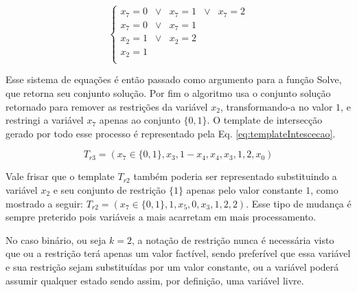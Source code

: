 \begin{equation}
\left\{\begin{matrix}
x_7	  = 0 	& \vee &	x_7	=	1 & \vee &	x_7	= 2	\\ 
x_7   = 0 	& \vee &	x_7	=	1					\\ 
x_2   = 1 	& \vee &	x_2	=	2					\\ 
x_2	  =	1											\\ 
\end{matrix}\right.
\label{eq:interseccaoRestrita}
\end{equation}

Esse sistema de equações é então passado como argumento para a função Solve, que retorna seu conjunto solução. Por fim o algoritmo usa o conjunto solução retornado para remover as restrições da variável $x_2$, transformando-a no valor $1$, e restringi a variável $x_7$ apenas ao conjunto $\{0,1\}$. O template de intersecção gerado por todo esse processo é representado pela Eq. \eqref{eq:templateIntescecao}.

\begin{equation}
T_{r3} = (x_7 \in \{0,1\}, x_3, 1-x_4, x_4, x_3, 1, 2, x_0)
\label{eq:templateIntescecao}
\end{equation}

Vale frisar que o template $T_{r2}$ também poderia ser representado substituindo a variável $x_2$ e seu conjunto de restrição $\{1\}$ apenas pelo valor constante $1$, como mostrado a seguir: $T_{r2} = (x_7 \in \{0,1\}, 1, x_5, 0, x_3, 1, 2, 2)$. Esse tipo de mudança é sempre preterido pois variáveis a mais acarretam em mais processamento.

No caso binário, ou seja $k = 2$, a notação de restrição nunca é necessária visto que ou a restrição terá apenas um valor factível, sendo preferível que essa variável e sua restrição sejam substituídas por um valor constante, ou a variável poderá assumir qualquer estado sendo assim, por definição, uma variável livre.